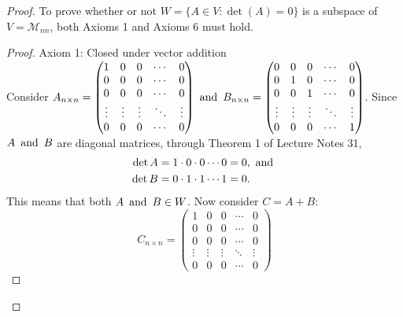 \documentclass{article}
\begin{document}
\begin{proof}
  To prove whether or not $W = \{A \in V : \det(A) = 0\}$ is a subspace of $V = \mathcal{M}_{nn}$, both Axioms 1 and Axioms 6 must hold.

  \begin{proof}
    Axiom 1: Closed under vector addition \\
    Consider $A_{n \times n} = \begin{pmatrix}
        1      & 0      & 0      & \cdots & 0      \\
        0      & 0      & 0      & \cdots & 0      \\
        0      & 0      & 0      & \cdots & 0      \\
        \vdots & \vdots & \vdots & \ddots & \vdots \\
        0      & 0      & 0      & \cdots & 0
      \end{pmatrix} \operatorname{~\text{and}~} B_{n \times n} = \begin{pmatrix}
        0      & 0      & 0      & \cdots & 0      \\
        0      & 1      & 0      & \cdots & 0      \\
        0      & 0      & 1      & \cdots & 0      \\
        \vdots & \vdots & \vdots & \ddots & \vdots \\
        0      & 0      & 0      & \cdots & 1
      \end{pmatrix}$. Since $A \operatorname{~\text{and}~} B$ are diagonal matrices, through Theorem 1 of Lecture Notes 31,
    \begin{align*}
      \det A & = 1 \cdot 0 \cdot 0 \cdots 0 = 0, \operatorname{~\text{and}~} \\
      \det B & = 0 \cdot 1 \cdot 1 \cdots 1 = 0.
    \end{align*}
    This means that both $A \operatorname{~\text{and}~} B \in W$. Now consider $C = A + B$:
    \[
      C_{n \times n} = \begin{pmatrix}
        1      & 0      & 0      & \cdots & 0      \\
        0      & 0      & 0      & \cdots & 0      \\
        0      & 0      & 0      & \cdots & 0      \\
        \vdots & \vdots & \vdots & \ddots & \vdots \\
        0      & 0      & 0      & \cdots & 0

\end{pmatrix}\]
\end{proof}
\end{proof}
\end{document}

